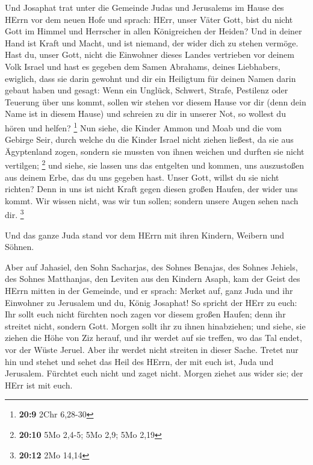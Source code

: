  Und Josaphat trat unter die Gemeinde Judas und Jerusalems
im Hause des HErrn vor dem neuen Hofe  und sprach: HErr,
unser Väter Gott, bist du nicht Gott im Himmel und Herrscher in allen
Königreichen der Heiden? Und in deiner Hand ist Kraft und Macht, und ist
niemand, der wider dich zu stehen vermöge.  Hast du, unser
Gott, nicht die Einwohner dieses Landes vertrieben vor deinem Volk
Israel und hast es gegeben dem Samen Abrahams, deines Liebhabers,
ewiglich,  dass sie darin gewohnt und dir ein Heiligtum für
deinen Namen darin gebaut haben und gesagt:  Wenn ein
Unglück, Schwert, Strafe, Pestilenz oder Teuerung über uns kommt, sollen
wir stehen vor diesem Hause vor dir (denn dein Name ist in diesem Hause)
und schreien zu dir in unserer Not, so wollest du hören und helfen?
\footnote{\textbf{20:9} 2Chr 6,28-30}  Nun siehe, die
Kinder Ammon und Moab und die vom Gebirge Seir, durch welche du die
Kinder Israel nicht ziehen ließest, da sie aus Ägyptenland zogen,
sondern sie mussten von ihnen weichen und durften sie nicht vertilgen;
\footnote{\textbf{20:10} 5Mo 2,4-5; 5Mo 2,9; 5Mo 2,19}  und
siehe, sie lassen uns das entgelten und kommen, uns auszustoßen aus
deinem Erbe, das du uns gegeben hast.  Unser Gott, willst
du sie nicht richten? Denn in uns ist nicht Kraft gegen diesen großen
Haufen, der wider uns kommt. Wir wissen nicht, was wir tun sollen;
sondern unsere Augen sehen nach dir. \footnote{\textbf{20:12} 2Mo 14,14}

 Und das ganze Juda stand vor dem HErrn mit ihren Kindern,
Weibern und Söhnen.

 Aber auf Jahasiel, den Sohn Sacharjas, des Sohnes Benajas,
des Sohnes Jehiels, des Sohnes Matthanjas, den Leviten aus den Kindern
Asaph, kam der Geist des HErrn mitten in der Gemeinde,  und
er sprach: Merket auf, ganz Juda und ihr Einwohner zu Jerusalem und du,
König Josaphat! So spricht der HErr zu euch: Ihr sollt euch nicht
fürchten noch zagen vor diesem großen Haufen; denn ihr streitet nicht,
sondern Gott.  Morgen sollt ihr zu ihnen hinabziehen; und
siehe, sie ziehen die Höhe von Ziz herauf, und ihr werdet auf sie
treffen, wo das Tal endet, vor der Wüste Jeruel.  Aber ihr
werdet nicht streiten in dieser Sache. Tretet nur hin und stehet und
sehet das Heil des HErrn, der mit euch ist, Juda und Jerusalem. Fürchtet
euch nicht und zaget nicht. Morgen ziehet aus wider sie; der HErr ist
mit euch.

